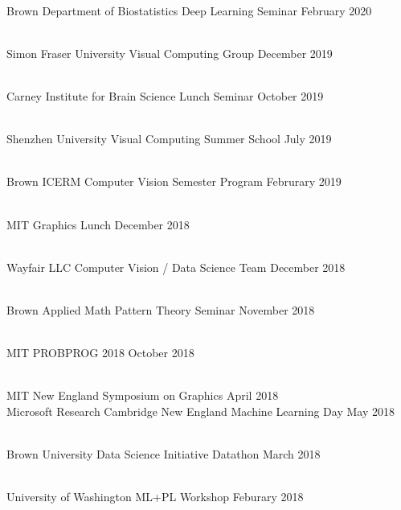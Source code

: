 \documentclass[line,margin]{res}
\begin{document}
\begin{resume}
\\
\talk
	{Brown Department of Biostatistics}
	{Deep Learning Seminar}
	{February 2020}

\\
\talk
	{Simon Fraser University}
	{Visual Computing Group}
	{December 2019}

\\
\talk
	{Carney Institute for Brain Science}
	{Lunch Seminar}
	{October 2019}

\\
\talk
	{Shenzhen University}
	{Visual Computing Summer School}
	{July 2019}

\\
\talk
	{Brown ICERM}
	{Computer Vision Semester Program}
	{Februrary 2019}

\\
\talk
	{MIT}
	{Graphics Lunch}
	{December 2018}

\\
\talk
	{Wayfair LLC}
	{Computer Vision / Data Science Team}
	{December 2018}

\\
\talk
	{Brown Applied Math}
	{Pattern Theory Seminar}
	{November 2018}

\\
\talk
	{MIT}
	{PROBPROG 2018}
	{October 2018}

\\
\talk
	{MIT}
	{New England Symposium on Graphics}
	{April 2018}\\
\talk
	{Microsoft Research Cambridge}
	{New England Machine Learning Day}
	{May 2018}

\\
\talk
	{Brown University Data Science Initiative}
	{Datathon}
	{March 2018}

\\
\talk
	{University of Washington}
	{ML+PL Workshop}
	{Feburary 2018}


\end{resume}
\end{document}
